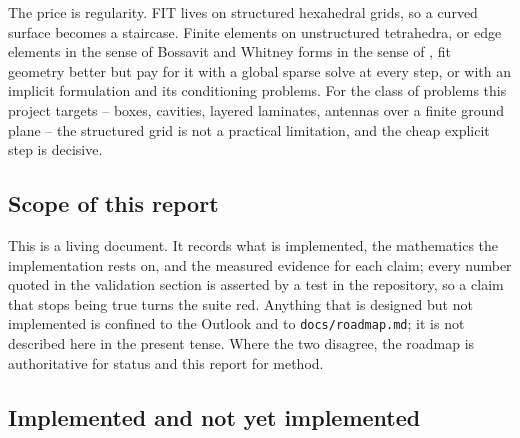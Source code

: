 The price is regularity. FIT lives on structured hexahedral grids, so a curved surface becomes a staircase.
Finite elements on unstructured tetrahedra, or edge elements in the sense of Bossavit \cite{bossavit1998} and
Whitney forms in the sense of \cite{jin2014}, fit geometry better but pay for it with a global sparse solve at
every step, or with an implicit formulation and its conditioning problems. For the class of problems this project
targets -- boxes, cavities, layered laminates, antennas over a finite ground plane -- the structured grid is not
a practical limitation, and the cheap explicit step is decisive.

\subsection{Scope of this report}

This is a living document. It records what is implemented, the mathematics the implementation rests on, and the
measured evidence for each claim; every number quoted in the validation section is asserted by a test in the
repository, so a claim that stops being true turns the suite red. Anything that is designed but not implemented is
confined to the Outlook and to \texttt{docs/roadmap.md}; it is not described here in the present
tense. Where the two disagree, the roadmap is authoritative for status and this report for method.

\subsection{Implemented and not yet implemented}

